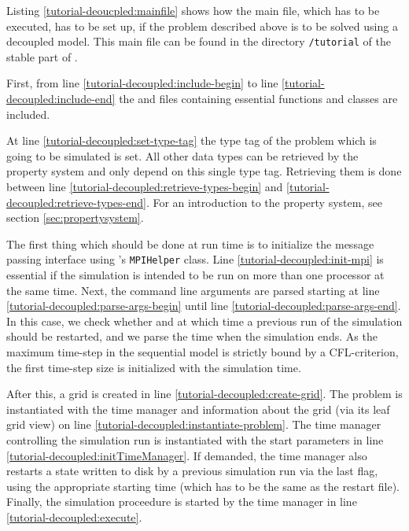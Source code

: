 Listing \ref{tutorial-deoucpled:mainfile} shows how the main file, which has to be executed, has to be set up, if the problem described above is to be solved using a decoupled model. This main file can be found in the directory \texttt{/tutorial} of the stable part of \Dumux.

\begin{lst}\label{tutorial-deoucpled:mainfile} \mbox{}

\end{lst}

First, from line \ref{tutorial-decoupled:include-begin} to line
\ref{tutorial-decoupled:include-end} the \Dune and \Dumux files containing
essential functions and classes are included.

At line \ref{tutorial-decoupled:set-type-tag} the type tag of the
problem which is going to be simulated is set. All other data types
can be retrieved by the \Dumux property system and only depend on this
single type tag. Retrieving them is done between line
\ref{tutorial-decoupled:retrieve-types-begin} and
\ref{tutorial-decoupled:retrieve-types-end}. For an introduction to the
property system, see section \ref{sec:propertysystem}.

The first thing which should be done at run time is to initialize the
message passing interface using \Dune's \texttt{MPIHelper} class. Line
\ref{tutorial-decoupled:init-mpi} is essential if the simulation is
intended to be run on more than one processor at the same time. Next,
the command line arguments are parsed starting at line
\ref{tutorial-decoupled:parse-args-begin} until line
\ref{tutorial-decoupled:parse-args-end}. In this case, we check whether and
at which time a previous run of the simulation should be restarted, and we
parse the time when the simulation ends. As the maximum time-step in the 
sequential model is strictly bound by a CFL-criterion, the first time-step
size is initialized with the simulation time.

After this, a grid is created in line \ref{tutorial-decoupled:create-grid}. 
The problem is instantiated with the time manager and information about the grid
(via its leaf grid view) on line \ref{tutorial-decoupled:instantiate-problem}.
The time manager controlling the simulation run is instantiated 
with the start parameters in line \ref{tutorial-decoupled:initTimeManager}.
If demanded, the time manager also restarts a state written to
disk by a previous simulation run via the last flag, using the appropriate 
starting time (which has to be the same as the restart file).
Finally, the simulation proceedure is started by the time manager in line
\ref{tutorial-decoupled:execute}.




